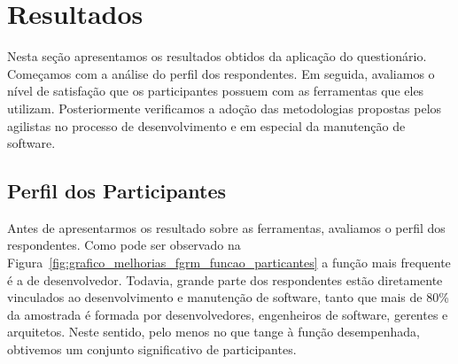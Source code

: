 




\section{Resultados}
\label{sec:analise_dados}

Nesta seção apresentamos os resultados obtidos da aplicação do questionário.
Começamos com a análise do perfil dos respondentes. Em seguida, avaliamos o
nível de satisfação que os participantes possuem com as ferramentas que eles
utilizam. Posteriormente verificamos a adoção das metodologias propostas pelos
agilistas no processo de desenvolvimento e em especial da manutenção de
software.

\subsection{Perfil dos Participantes}
\label{sub:pesquisa_prof_perfil_dos_participantes}

Antes de apresentarmos os resultado sobre as ferramentas, avaliamos o perfil dos
respondentes. Como pode ser observado na
Figura~\ref{fig:grafico_melhorias_fgrm_funcao_particantes} a função mais
frequente é a de desenvolvedor. Todavia, grande parte dos respondentes estão
diretamente vinculados ao desenvolvimento e manutenção de software, tanto que
mais de 80\% da amostrada é formada por desenvolvedores, engenheiros de
software, gerentes e arquitetos. Neste sentido, pelo menos no que tange à função
desempenhada, obtivemos um conjunto significativo de participantes.

